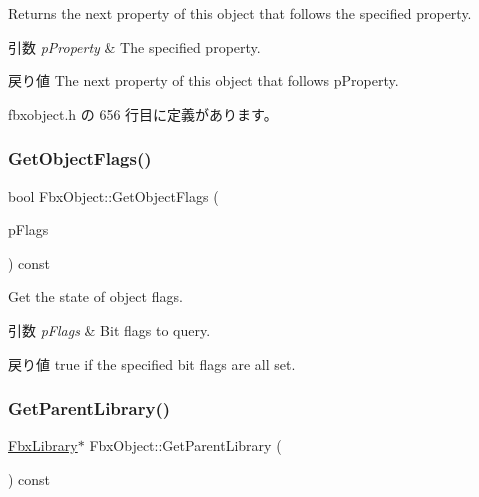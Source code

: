 Returns the next property of this object that follows the specified property. 
\begin{DoxyParams}{引数}
{\em p\+Property} & The specified property. \\
\hline
\end{DoxyParams}
\begin{DoxyReturn}{戻り値}
The next property of this object that follows p\+Property. 
\end{DoxyReturn}


 fbxobject.\+h の 656 行目に定義があります。

\mbox{\label{class_fbx_object_a02d91c1f2930a03cfd0e8c2b1fffa0ee}} 
\subsubsection{\texorpdfstring{Get\+Object\+Flags()}{GetObjectFlags()}}
{\footnotesize\ttfamily bool Fbx\+Object\+::\+Get\+Object\+Flags (\begin{DoxyParamCaption}\item[{\hyperlink{class_fbx_object_a117b8002963e9fe475a93556c217b244}{E\+Object\+Flag}}]{p\+Flags }\end{DoxyParamCaption}) const}

Get the state of object flags. 
\begin{DoxyParams}{引数}
{\em p\+Flags} & Bit flags to query. \\
\hline
\end{DoxyParams}
\begin{DoxyReturn}{戻り値}
{\ttfamily true} if the specified bit flags are all set. 
\end{DoxyReturn}
\mbox{\label{class_fbx_object_a858b87f791a3440fb9c24d3b4593935d}} 
\subsubsection{\texorpdfstring{Get\+Parent\+Library()}{GetParentLibrary()}}
{\footnotesize\ttfamily \hyperlink{class_fbx_library}{Fbx\+Library}$\ast$ Fbx\+Object\+::\+Get\+Parent\+Library (\begin{DoxyParamCaption}{ }\end{DoxyParamCaption}) const}

